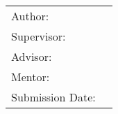 \begin{titlepage}
  \centering


  \vspace{5mm}
  {\huge\MakeUppercase{\getFaculty{}}}\\

  \vspace{5mm}
  {\large\MakeUppercase{\getUniversity{}}}\\

  \vspace{20mm}
  {\Large \getDoctype{}}

  \vspace{15mm}
  {\Large\bfseries \getTitle{}}

  \vspace{10mm}
  {\Large\bfseries \foreignlanguage{ngerman}{\getTitleGer{}}}

  \vspace{30mm}
  \begin{tabular}{l l}
    Author:          & \getAuthor{} \\
    Supervisor:      & \getSupervisor{} \\
    Advisor:         & \getAdvisor{} \\
    Mentor:         & \getMentor{} \\
    Submission Date: & \getSubmissionDate{} \\
  \end{tabular}

\end{titlepage}
